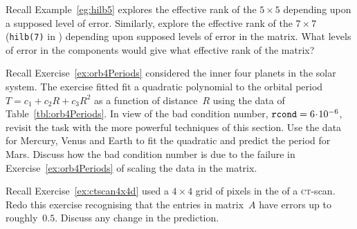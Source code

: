 \begin{exercise} \label{ex:hilb7} 
Recall Example~\ref{eg:hilb5} explores the effective rank of the \(5\times5\)  depending upon a supposed level of error.
Similarly, explore the effective rank of the \(7\times7\)  (\verb|hilb(7)| in \script) depending upon supposed levels of error in the matrix.
What levels of error in the components would give what effective rank of the matrix?
\end{exercise}









\begin{exercise} \label{ex:orb4Periods2} 
Recall Exercise~\ref{ex:orb4Periods} considered the inner four planets in the solar system.
The exercise fitted fit a quadratic polynomial to the orbital period \(T=c_1+c_2R+c_3R^2\) as a function of distance~\(R\) using the data of Table~\ref{tbl:orb4Periods}.
In view of the bad condition number, \(\verb|rcond|=6\cdot10^{-6}\), revisit the task with the more powerful techniques of this section.
Use the data for Mercury, Venus and Earth to fit the quadratic and predict the period for Mars.
Discuss how the bad condition number is due to the failure in Exercise~\ref{ex:orb4Periods} of scaling the data in the matrix.
\end{exercise}



\begin{exercise} \label{ex:} 
Recall Exercise~\ref{ex:ctscan4x4d} used a \(4\times4\) grid of pixels in the  of a \textsc{ct}-scan.
Redo this exercise recognising that the entries in matrix~\(A\) have errors up to roughly~\(0.5\).
Discuss any change in the prediction.
\end{exercise}




